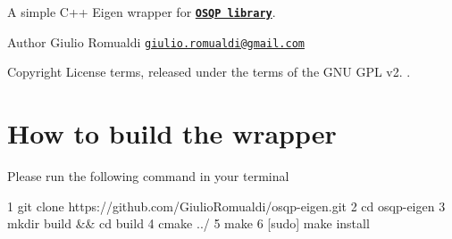 A simple C++ Eigen wrapper for \href{http://osqp.readthedocs.io/en/latest/}{\tt {\bfseries O\+S\+QP library}}. \begin{DoxyAuthor}{Author}
Giulio Romualdi \href{mailto:giulio.romualdi@gmail.com}{\tt giulio.\+romualdi@gmail.\+com} ~\newline
 
\end{DoxyAuthor}
\begin{DoxyCopyright}{Copyright}
License terms, released under the terms of the G\+NU G\+PL v2. .
\end{DoxyCopyright}
\hypertarget{index_build-section}{}\section{How to build the wrapper}\label{index_build-section}
Please run the following command in your terminal 
\begin{DoxyCode}
1 git clone https://github.com/GiulioRomualdi/osqp-eigen.git
2 cd osqp-eigen
3 mkdir build && cd build
4 cmake ../
5 make
6 [sudo] make install
\end{DoxyCode}


